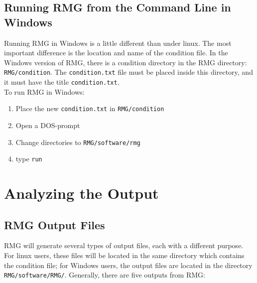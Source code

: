\documentclass[12pt,letterpaper]{article}
\begin{document}
\subsection{Running RMG from the Command Line in Windows}\label{running in windows}

Running RMG in Windows is a little different than under linux. The most
important difference is the location and name of the condition file. In the
Windows version of RMG, there is a condition directory in the RMG directory:
\texttt{RMG/condition}. The \texttt{condition.txt} file must be placed inside this
directory, and it must have the title \texttt{condition.txt}.\\

To run RMG in Windows:

\begin{enumerate}
\item  Place the new \texttt{condition.txt} in \texttt{RMG/condition}\\

\item  Open a DOS-prompt\\

\item  Change directories to \texttt{RMG/software/rmg}\\

\item  type \texttt{run}
\end{enumerate}

\section{Analyzing the Output}
\subsection{RMG Output Files}\label{RMG output}

RMG will generate several types of output files, each with a different purpose.
For linux users, these files will be located in the same directory which
contains the condition file; for Windows users, the output files are located
in the directory \texttt{RMG/software/RMG/}. Generally, there are five outputs from
RMG:
\end{document}
